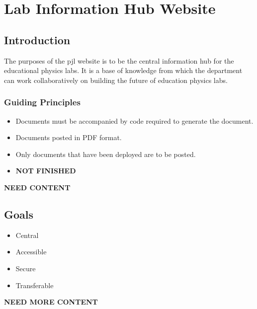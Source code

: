 \documentclass[justified]{LabArx3_5_1}
\begin{document}




\maketitle
\tableofcontents
\newpage

\section{Lab Information Hub Website}

\subsection{Introduction}

The purposes of the pjl website is to be the central information hub for the educational physics labs. It is a base of knowledge from which the department can work collaboratively on building the future of education physics labs.

\subsubsection{Guiding Principles}

\begin{itemize}
\item Documents must be accompanied by code required to generate the document.
\item Documents posted in PDF format.
\item Only documents that have been deployed are to be posted.
\item {\bf NOT FINISHED}
\end{itemize}

{\bf NEED CONTENT}

\subsection{Goals}

\begin{itemize}
\item Central
\item Accessible
\item Secure
\item Transferable
\end{itemize}
{\bf NEED MORE CONTENT}
\end{document}
